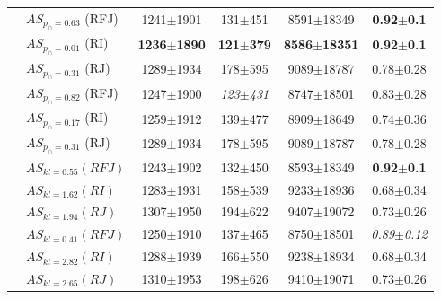 \begin{table}
\begin{center}
\begin{tabular}{clcccc}
        & $AS_{p_{\cap} = 0.63}$ (RFJ) & 1241$\pm$1901 & 131$\pm$451 & 8591$\pm$18349 & \textbf{0.92$\pm$0.1} \\
        & $AS_{p_{\cap} = 0.01}$ (RI) & \textbf{1236$\pm$1890} & \textbf{121$\pm$379} & \textbf{8586$\pm$18351} & \textbf{0.92$\pm$0.1} \\ 
        & $AS_{p_{\cap} = 0.31}$ (RJ) & 1289$\pm$1934 & 178$\pm$595 & 9089$\pm$18787 & 0.78$\pm$0.28\\
        & $AS_{p_{\cap} = 0.82}$ (RFJ) & 1247$\pm$1900 & \emph{123$\pm$431} & 8747$\pm$18501 &  0.83$\pm$0.28 \\
        & $AS_{p_{\cap} = 0.17}$ (RI) & 1259$\pm$1912 & 139$\pm$477 & 8909$\pm$18649 & 0.74$\pm$0.36\\
        & $AS_{p_{\cap} = 0.31}$ (RJ) & 1289$\pm$1934 & 178$\pm$595 & 9089$\pm$18787 & 0.78$\pm$0.28 \\
        & $AS_{kl = 0.55} (RFJ)$ & 1243$\pm$1902 & 132$\pm$450 & 8593$\pm$18349 & \textbf{0.92$\pm$0.1} \\
        & $AS_{kl = 1.62} (RI)$ & 1283$\pm$1931 & 158$\pm$539 & 9233$\pm$18936 &  0.68$\pm$0.34 \\ 
        & $AS_{kl = 1.94} (RJ)$ & 1307$\pm$1950 & 194$\pm$622 & 9407$\pm$19072 & 0.73$\pm$0.26\\
        & $AS_{kl = 0.41} (RFJ)$ & 1250$\pm$1910 & 137$\pm$465 & 8750$\pm$18501 & \emph{0.89$\pm$0.12}\\ 
        & $AS_{kl = 2.82} (RI)$ & 1288$\pm$1939 & 166$\pm$550 & 9238$\pm$18934 &  0.68$\pm$0.34 \\ 
        & $AS_{kl = 2.65} (RJ)$ & 1310$\pm$1953 & 198$\pm$626 & 9410$\pm$19071 & 0.73$\pm$0.26\\
  

\end{tabular}
\end{center}
\end{table}
